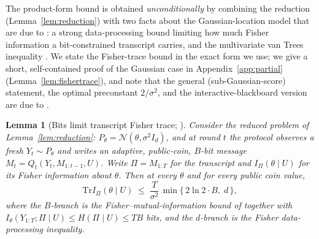 \documentclass[11pt]{article}
\newtheorem{lemma}{Lemma}
\theoremstyle{definition}
\newcommand{\Tr}{\mathrm{Tr}}
\newcommand{\Ncal}{\mathcal{N}}
\begin{document}
The product-form bound is obtained \emph{unconditionally} by combining the reduction
(Lemma~\ref{lem:reduction}) with two facts about the Gaussian-location model that are due to
\citet{barnes2021fisher}: a strong data-processing bound limiting how much Fisher information a
bit-constrained transcript carries, and the multivariate van Trees inequality
\citep{gilllevit1995}. We state the Fisher-trace bound in the exact form we use; we give a short,
self-contained proof of the Gaussian case in Appendix~\ref{app:partial}
(Lemma~\ref{lem:fishertrace}), and note that the general (sub-Gaussian-score) statement, the optimal
preconstant $2/\sigma^2$, and the interactive-blackboard version are due to \citet{barnes2021fisher}.

\begin{lemma}[Bits limit transcript Fisher trace; {\citealp[Thm.~1, Cor.~1--2]{barnes2021fisher}}]
\label{lem:fishertranscript}
Consider the reduced problem of Lemma~\ref{lem:reduction}: $P_\theta=\Ncal(\theta,\sigma^2 I_d)$, and at
round $t$ the protocol observes a fresh $Y_t\sim P_\theta$ and writes an adaptive, public-coin,
$B$-bit message $M_t=Q_t(Y_t,M_{1:t-1},U)$. Write $\Pi=M_{1:T}$ for the transcript and $I_\Pi(\theta\mid U)$
for its Fisher information about $\theta$. Then at every $\theta$ and for every public coin value,
\[
  \Tr I_\Pi(\theta\mid U)\;\le\;\frac{T}{\sigma^2}\,\min\{\,2\ln2\cdot B,\;d\,\},
\]
where the $B$-branch is the Fisher--mutual-information bound of \citet{barnes2021fisher} together with
$I_\theta(Y_{1:T};\Pi\mid U)\le H(\Pi\mid U)\le TB$ bits, and the $d$-branch is the Fisher
data-processing inequality.
\end{lemma}
\end{document}
